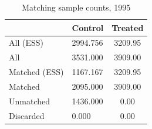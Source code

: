 \begin{table}

\caption{\label{tab:psm}Matching sample counts, 1995}
\centering
\begin{tabular}[t]{llc}
\toprule
  & Control & Treated\\
\midrule
All (ESS) & 2994.756 & 3209.95\\
All & 3531.000 & 3909.00\\
Matched (ESS) & 1167.167 & 3209.95\\
Matched & 2095.000 & 3909.00\\
Unmatched & 1436.000 & 0.00\\
\addlinespace
Discarded & 0.000 & 0.00\\
\bottomrule
\end{tabular}
\end{table}
